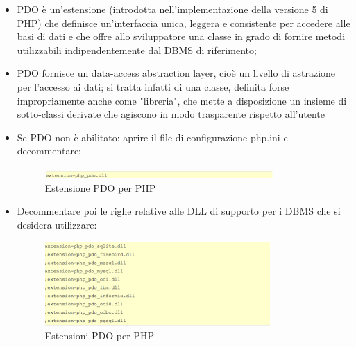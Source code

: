 \begin{itemize}

\item PDO è un’estensione (introdotta nell'implementazione della versione 5 di PHP) che definisce un’interfaccia unica, leggera e consistente per accedere alle basi di dati e che offre allo sviluppatore una classe in grado di fornire metodi utilizzabili indipendentemente dal DBMS di riferimento;
\item PDO fornisce un data-access abstraction layer, cioè un livello di astrazione per l'accesso ai dati; si tratta infatti di una classe, definita forse impropriamente anche come "libreria", che mette a disposizione un insieme di sotto-classi derivate che agiscono in modo trasparente rispetto all'utente
\item Se PDO non è abilitato: aprire il file di configurazione php.ini e decommentare:

\begin{center}
\begin{figure}[H]
\centering
\includegraphics[scale=1]{figures/extensionphppdo.png}
\caption{Estensione PDO per PHP} 
\end{figure}
\end{center}

\item Decommentare poi le righe relative alle DLL di supporto per i DBMS che si desidera utilizzare:

\begin{center}
\begin{figure}[H]
\centering
\includegraphics[scale=1]{figures/extensionsphppdo.png}
\caption{Estensioni PDO per PHP} 
\end{figure}
\end{center}

\end{itemize}


